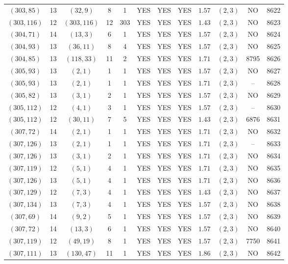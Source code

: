 \begin{longtable}{|c|c|c|c|c|c|c|c|c|c|c|c|}
$(303,85)$ & 13 & $(32,9)$ & 8 & 1 & YES & YES & YES & $1.57$ & $(2,3)$ & NO & 8622\\
$(303,116)$ & 12 & $(303,116)$ & 12 & 303 & YES & YES & YES & $1.43$ & $(2,3)$ & NO & 8623\\
$(304,71)$ & 14 & $(13,3)$ & 6 & 1 & YES & YES & YES & $1.57$ & $(2,3)$ & NO & 8624\\
$(304,93)$ & 13 & $(36,11)$ & 8 & 4 & YES & YES & YES & $1.57$ & $(2,3)$ & NO & 8625\\
$(304,85)$ & 13 & $(118,33)$ & 11 & 2 & YES & YES & YES & $1.71$ & $(2,3)$ & 8795 & 8626\\
$(305,93)$ & 13 & $(2,1)$ & 1 & 1 & YES & YES & YES & $1.57$ & $(2,3)$ & NO & 8627\\
$(305,93)$ & 13 & $(2,1)$ & 1 & 1 & YES & YES & YES & $1.71$ & $(2,3)$ & -- & 8628\\
$(305,82)$ & 13 & $(3,1)$ & 2 & 1 & YES & YES & YES & $1.57$ & $(2,3)$ & NO & 8629\\
$(305,112)$ & 12 & $(4,1)$ & 3 & 1 & YES & YES & YES & $1.57$ & $(2,3)$ & -- & 8630\\
$(305,112)$ & 12 & $(30,11)$ & 7 & 5 & YES & YES & YES & $1.43$ & $(2,3)$ & 6876 & 8631\\
$(307,72)$ & 14 & $(2,1)$ & 1 & 1 & YES & YES & YES & $1.71$ & $(2,3)$ & NO & 8632\\
$(307,126)$ & 13 & $(2,1)$ & 1 & 1 & YES & YES & YES & $1.71$ & $(2,3)$ & -- & 8633\\
$(307,126)$ & 13 & $(3,1)$ & 2 & 1 & YES & YES & YES & $1.71$ & $(2,3)$ & NO & 8634\\
$(307,119)$ & 12 & $(5,1)$ & 4 & 1 & YES & YES & YES & $1.71$ & $(2,3)$ & NO & 8635\\
$(307,126)$ & 13 & $(5,1)$ & 4 & 1 & YES & YES & YES & $1.71$ & $(2,3)$ & NO & 8636\\
$(307,129)$ & 12 & $(7,3)$ & 4 & 1 & YES & YES & YES & $1.43$ & $(2,3)$ & NO & 8637\\
$(307,134)$ & 13 & $(7,3)$ & 4 & 1 & YES & YES & YES & $1.57$ & $(2,3)$ & NO & 8638\\
$(307,69)$ & 14 & $(9,2)$ & 5 & 1 & YES & YES & YES & $1.57$ & $(2,3)$ & NO & 8639\\
$(307,72)$ & 14 & $(13,3)$ & 6 & 1 & YES & YES & YES & $1.57$ & $(2,3)$ & NO & 8640\\
$(307,119)$ & 12 & $(49,19)$ & 8 & 1 & YES & YES & YES & $1.57$ & $(2,3)$ & 7750 & 8641\\
$(307,111)$ & 13 & $(130,47)$ & 11 & 1 & YES & YES & YES & $1.86$ & $(2,3)$ & NO & 8642\\

\end{longtable}
